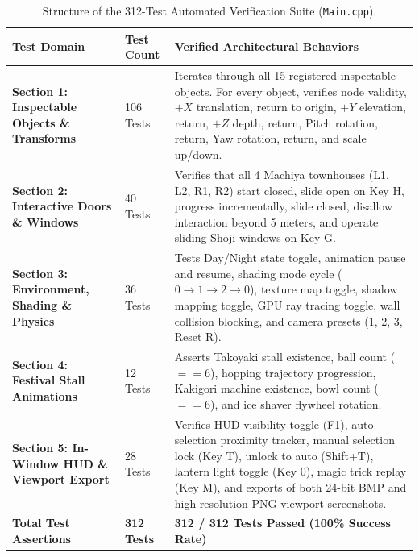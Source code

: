 \begin{table}[htbp]
\centering
\footnotesize
\renewcommand{\arraystretch}{0.92}
\begin{tabularx}{\textwidth}{p{4.2cm} p{2.2cm} p{8.0cm}}
\toprule
\textbf{Test Domain} & \textbf{Test Count} & \textbf{Verified Architectural Behaviors} \\
\midrule
\textbf{Section 1: Inspectable Objects \& Transforms} &
106 Tests &
Iterates through all 15 registered inspectable objects. For every object, verifies node validity, $+X$ translation, return to origin, $+Y$ elevation, return, $+Z$ depth, return, Pitch rotation, return, Yaw rotation, return, and scale up/down. \\
\addlinespace
\textbf{Section 2: Interactive Doors \& Windows} &
40 Tests &
Verifies that all 4 Machiya townhouses (L1, L2, R1, R2) start closed, slide open on Key H, progress incrementally, slide closed, disallow interaction beyond 5 meters, and operate sliding Shoji windows on Key G. \\
\addlinespace
\textbf{Section 3: Environment, Shading \& Physics} &
36 Tests &
Tests Day/Night state toggle, animation pause and resume, shading mode cycle ($0 \to 1 \to 2 \to 0$), texture map toggle, shadow mapping toggle, GPU ray tracing toggle, wall collision blocking, and camera presets (1, 2, 3, Reset R). \\
\addlinespace
\textbf{Section 4: Festival Stall Animations} &
12 Tests &
Asserts Takoyaki stall existence, ball count ($== 6$), hopping trajectory progression, Kakigori machine existence, bowl count ($== 6$), and ice shaver flywheel rotation. \\
\addlinespace
\textbf{Section 5: In-Window HUD \& Viewport Export} &
28 Tests &
Verifies HUD visibility toggle (F1), auto-selection proximity tracker, manual selection lock (Key T), unlock to auto (Shift+T), lantern light toggle (Key 0), magic trick replay (Key M), and exports of both 24-bit BMP and high-resolution PNG viewport screenshots. \\
\midrule
\textbf{Total Test Assertions} &
\textbf{312 Tests} &
\textbf{312 / 312 Tests Passed (100\% Success Rate)} \\
\bottomrule
\end{tabularx}
\caption{Structure of the 312-Test Automated Verification Suite (\texttt{Main.cpp}).}
\label{tab:test_suite}
\end{table}

